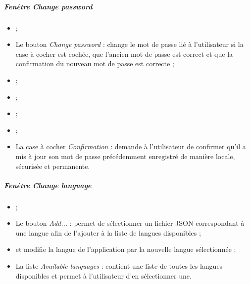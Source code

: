 \subparagraph{Fenêtre \emph{Change password}}
\begin{itemize}
\item {} ;
\item Le bouton \emph{Change password} : change le mot de passe lié à l'utilisateur si la case à cocher est cochée, que l'ancien mot de passe est correct et que la confirmation du nouveau mot de passe est correcte ;
\item {} ;
\item {} ;
\item {} ;
\item {} ;
\item La case à cocher \emph{Confirmation} : demande à l'utilisateur de confirmer qu'il a mis à jour son mot de passe précédemment enregistré de manière locale, sécurisée et permanente.
\end{itemize}


\subparagraph{Fenêtre \emph{Change language}}
\begin{itemize}
\item {} ;
\item Le bouton \emph{Add...} : permet de sélectionner un fichier JSON correspondant à une langue afin de l'ajouter à la liste de langues disponibles ;
\item {} et modifie la langue de l'application par la nouvelle langue sélectionnée ;
\item La liste \emph{Available languages} : contient une liste de toutes les langues disponibles et permet à l'utilisateur d'en sélectionner une.
\end{itemize}


